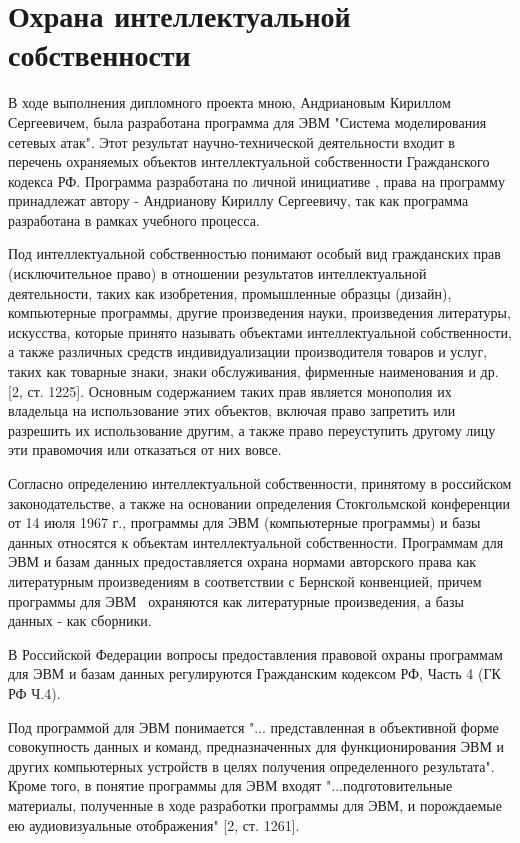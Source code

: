 \newpage
\chapter{Охрана интеллектуальной собственности}

    В ходе выполнения дипломного проекта мною, Андриановым Кириллом Сергеевичем, была разработана программа для ЭВМ "Система моделирования сетевых атак". Этот результат научно-технической деятельности входит в перечень охраняемых объектов интеллектуальной собственности Гражданского кодекса РФ. Программа разработана по личной инициативе , права на программу принадлежат автору - Андрианову Кириллу Сергеевичу, так как программа разработана в рамках учебного процесса.

    Под интеллектуальной собственностью понимают особый вид гражданских прав (исключительное право) в отношении результатов интеллектуальной деятельности, таких как изобретения, промышленные образцы (дизайн), компьютерные программы, другие произведения науки, произведения литературы, искусства, которые принято называть объектами интеллектуальной собственности, а также различных средств индивидуализации производителя товаров и услуг, таких как товарные знаки, знаки обслуживания, фирменные наименования и др. [2, ст. 1225]. Основным содержанием таких прав является монополия их владельца на использование этих объектов, включая право запретить или разрешить их использование другим, а также право переуступить другому лицу эти правомочия или отказаться от них вовсе.

    Согласно определению интеллектуальной собственности, принятому в российском законодательстве, а также на основании определения Стокгольмской конференции от 14 июля 1967 г., программы для ЭВМ (компьютерные программы) и базы данных относятся к объектам интеллектуальной собственности. Программам для ЭВМ и базам данных предоставляется охрана нормами авторского права как литературным произведениям в соответствии с Бернской конвенцией, причем программы для ЭВМ \
    охраняются как литературные произведения, а базы данных - как сборники.

    В Российской Федерации вопросы предоставления правовой охраны программам для ЭВМ и базам данных регулируются Гражданским кодексом РФ, Часть 4 (ГК РФ Ч.4).

    Под программой для ЭВМ понимается "... представленная в объективной форме совокупность данных и команд, предназначенных для функционирования ЭВМ и других компьютерных устройств в целях получения определенного результата". Кроме того, в понятие программы для ЭВМ входят "...подготовительные материалы, полученные в ходе разработки программы для ЭВМ, и порождаемые ею аудиовизуальные отображения" [2, ст. 1261].

